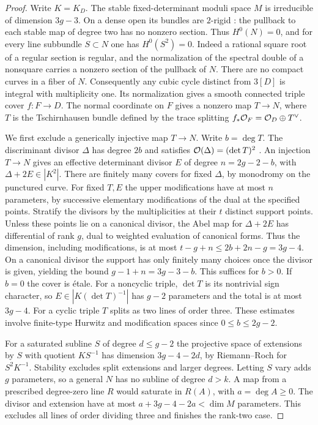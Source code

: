 \begin{proof}
Write $K=K_D$. The stable fixed-determinant moduli space $M$ is irreducible
of dimension $3g-3$. On a dense open its bundles are $2$-rigid
\cite[Theorem~2.2 and \S3]{BP06}: the pullback to each stable map
of degree two has no nonzero section. Thus $H^0(N)=0$, and for every line
subbundle $S\subset N$ one has $H^0(S^2)=0$. Indeed a rational square
root of a regular section is regular, and the normalization of the spectral
double of a nonsquare carries a nonzero section of the pullback of $N$.
There are no compact curves in a fiber of $N$. Consequently any cubic
cycle distinct from $3[D]$ is integral with multiplicity one. Its
normalization gives a smooth connected triple cover $f:F\to D$. The
normal coordinate on $F$ gives a nonzero map $T\to N$, where
$T$ is the Tschirnhausen bundle defined by the trace splitting $f_*\mathcal O_F=\mathcal O_D\oplus T^\vee$.

We first exclude a generically injective map $T\to N$. Write $b=\deg T$. The discriminant divisor $\Delta$
has degree $2b$ and satisfies $\mathcal O(\Delta)=(\det T)^2$ \cite[\S\S3--4]{Miranda}.
An injection $T\to N$ gives an effective determinant divisor $E$ of
degree $n=2g-2-b$, with $\Delta+2E\in|K^2|$. There are finitely many
covers for fixed $\Delta$, by monodromy on the punctured curve. For fixed
$T,E$ the upper modifications have at most $n$ parameters, by successive
elementary modifications of the dual at the specified points. Stratify
the divisors by the multiplicities at their $t$ distinct support points.
Unless these points lie on a canonical divisor, the Abel map for
$\Delta+2E$ has differential of rank $g$, dual to weighted evaluation of
canonical forms. Thus the dimension, including modifications, is at most
$t-g+n\leq2b+2n-g=3g-4$. On a canonical divisor the support has only
finitely many choices once the divisor is given, yielding the bound
$g-1+n=3g-3-b$. This suffices for $b>0$. If $b=0$ the cover is
\'etale. For a noncyclic triple, $\det T$ is its nontrivial sign
character, so $E\in|K(\det T)^{-1}|$ has $g-2$ parameters and the total
is at most $3g-4$. For a cyclic triple $T$ splits as two lines of order
three. These estimates involve finite-type Hurwitz and modification
spaces since $0\leq b\leq2g-2$.

For a saturated subline $S$ of degree $d\leq g-2$ the projective space
of extensions by $S$ with quotient $KS^{-1}$ has dimension $3g-4-2d$,
by Riemann--Roch for $S^2K^{-1}$. Stability excludes split extensions
and larger degrees. Letting $S$ vary adds $g$ parameters, so a general
$N$ has no subline of degree $d>k$. A map from a prescribed degree-zero
line $R$ would saturate in $R(A)$, with $a=\deg A\geq0$. The divisor
and extension have at most $a+3g-4-2a<\dim M$ parameters. This excludes
all lines of order dividing three and finishes the rank-two case.


\end{proof}
